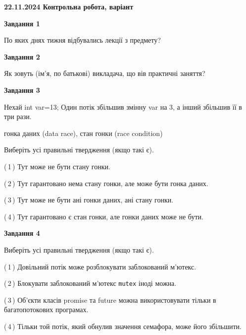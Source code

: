 \documentclass[12pt, ukrainian]{article}
\def\code#1{\Verb!#1!}
\begin{document}
\begin {large}

\textbf{22.11.2024 Контрольна робота, варіант  }\par


{

\begin{center}
\textbf{Завдання 1}
\end{center}

По яких днях тижня відбувались лекції з предмету?


\begin{center}
\textbf{Завдання 2}
\end{center}

Як зовуть (ім'я, по батькові) викладача, що вів практичні заняття?


\begin{center}
\textbf{Завдання 3}
\end{center}

Нехай int var=13; Один потік збільшив змінну var на 3, а інший збільшив її в три рази.

гонка даних (data race), стан гонки (race condition)

Виберіть усі правильні твердження (якщо такі є).\par
\vspace{2mm}
(\,1\,) Тут може не бути стану гонки.%

(\,2\,) Тут гарантовано нема стану гонки, але може бути гонка даних.%

(\,3\,) Тут може не бути ані гонки даних, ані стану гонки.%

(\,4\,) Тут гарантовано є стан гонки, але гонки даних може не бути.%


\begin{center}
\textbf{Завдання 4}
\end{center}

Виберіть усі правильні твердження (якщо такі є).\par
\vspace{2mm}

(\,1\,) Довільний потік може розблокувати заблокований м’ютекс.%

(\,2\,) Блокувати заблокований м’ютекс  \code{mutex} іноді можна.%

(\,3\,) Об’єкти класів promise та future можна використовувати тільки в багатопотокових програмах.%

(\,4\,) Тільки той потік, який обнулив значення семафора, може його збільшити.%


}
\end{large}
\end{document}
